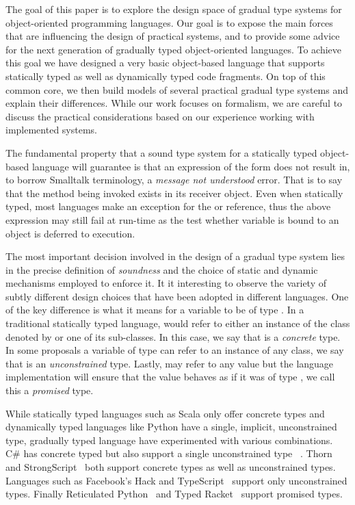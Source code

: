\documentclass[preprint]{sigplanconf}
\newcommand{\xt}[1]{\sf{#1}}
\begin{document}
The goal of this paper is to explore the design space of gradual type
systems for object-oriented programming languages. Our goal is to expose the
main forces that are influencing the design of practical systems, and to
provide some advice for the next generation of gradually typed
object-oriented languages. To achieve this goal we have designed a very
basic object-based language that supports statically typed as well as
dynamically typed code fragments. On top of this common core, we then build
models of several practical gradual type systems and explain their
differences. While our work focuses on formalism, we are careful to discuss
the practical considerations based on our experience working with
implemented systems.

The fundamental property that a sound type system for a statically typed
object-based language will guarantee is that an expression of the form
\xt{x.m(y)} does not result in, to borrow Smalltalk terminology, a
\emph{message not understood} error.  That is to say that the method being
invoked exists in its receiver object.  Even when statically typed, most
languages make an exception for the \xt{null} or \xt{undefined} reference,
thus the above expression may still fail at run-time as the test whether
variable \xt{x} is bound to an object is deferred to execution.

The most important decision involved in the design of a gradual type system
lies in the precise definition of \emph{soundness} and the choice of static
and dynamic mechanisms employed to enforce it. It it interesting to observe
the variety of subtly different design choices that have been adopted in
different languages.  One of the key difference is what it means for a
variable \xt{x} to be of type \xt{T}. In a traditional statically typed
language, \xt{x} would refer to either an instance of the class denoted by
\xt{T} or one of its sub-classes.  In this case, we say that \xt{T} is a
\emph{concrete} type. In some proposals a variable \xt{x} of type \xt{T} can
refer to an instance of any class, we say that \xt{T} is an
\emph{unconstrained} type. Lastly, \xt{x} may refer to any value but the
language implementation will ensure that the value behaves as if it was of
type \xt{T}, we call this a \emph{promised} type.

While statically typed languages such as Scala only offer concrete types and
dynamically typed languages like Python have a single, implicit,
unconstrained type, gradually typed language have experimented with various
combinations.  C\# has concrete typed but also support a single
unconstrained type \xt{dyn}~\cite{Bierman10}. Thorn~\cite{popl10} and
StrongScript~\cite{ecoop15} both support concrete types as well as
unconstrained types. Languages such as Facebook's Hack and
TypeScript~\cite{typescript13} support only unconstrained types.  Finally
Reticulated Python~\cite{siek14} and Typed Racket~\cite{tf-dls06} support
promised types.
\end{document}

